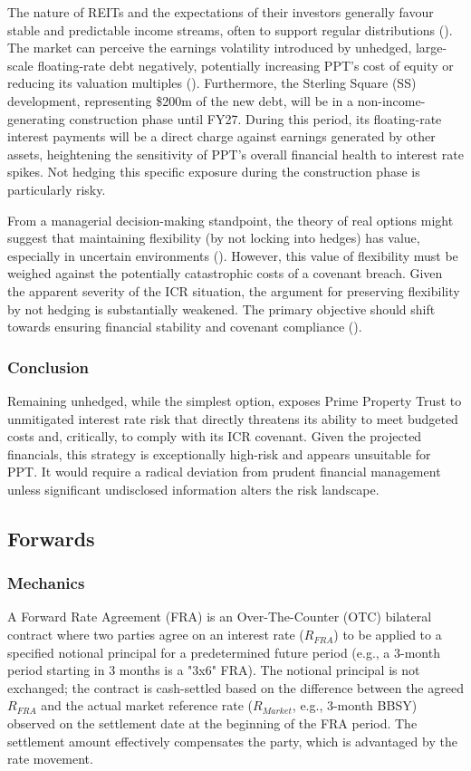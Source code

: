 \documentclass[11pt, a4paper, british]{article}
\begin{document}
The nature of REITs and the expectations of their investors generally favour stable and predictable income streams, often to support regular distributions (\cite{g}). The market can perceive the earnings volatility introduced by unhedged, large-scale floating-rate debt negatively, potentially increasing PPT's cost of equity or reducing its valuation multiples (\cite{aw}). Furthermore, the Sterling Square (SS) development, representing \$200m of the new debt, will be in a non-income-generating construction phase until FY27. During this period, its floating-rate interest payments will be a direct charge against earnings generated by other assets, heightening the sensitivity of PPT's overall financial health to interest rate spikes. Not hedging this specific exposure during the construction phase is particularly risky.

From a managerial decision-making standpoint, the theory of real options might suggest that maintaining flexibility (by not locking into hedges) has value, especially in uncertain environments (\cite{d}). However, this value of flexibility must be weighed against the potentially catastrophic costs of a covenant breach. Given the apparent severity of the ICR situation, the argument for preserving flexibility by not hedging is substantially weakened. The primary objective should shift towards ensuring financial stability and covenant compliance (\cite{t}).

\subsubsection{Conclusion}
Remaining unhedged, while the simplest option, exposes Prime Property Trust to unmitigated interest rate risk that directly threatens its ability to meet budgeted costs and, critically, to comply with its ICR covenant. Given the projected financials, this strategy is exceptionally high-risk and appears unsuitable for PPT. It would require a radical deviation from prudent financial management unless significant undisclosed information alters the risk landscape.

\newpage

\subsection{Forwards}

\subsubsection{Mechanics}
A Forward Rate Agreement (FRA) is an Over-The-Counter (OTC) bilateral contract where two parties agree on an interest rate ($R_{FRA}$) to be applied to a specified notional principal for a predetermined future period (e.g., a 3-month period starting in 3 months is a "3x6" FRA). The notional principal is not exchanged; the contract is cash-settled based on the difference between the agreed $R_{FRA}$ and the actual market reference rate ($R_{Market}$, e.g., 3-month BBSY) observed on the settlement date at the beginning of the FRA period. The settlement amount effectively compensates the party, which is advantaged by the rate movement.
\end{document}
